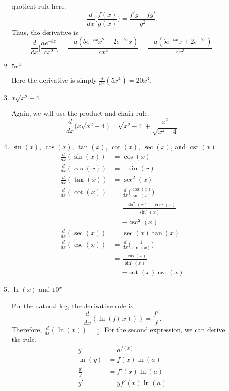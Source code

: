 \begin{enumerate}
\begin{enumerate}[label = (\alph*)]
    quotient rule here,
    \[
    \frac{d}{dx}\bigg(\frac{f(x)}{g(x)}\bigg) = \frac{f'g - fg'}{g^2}.
    \]
    Thus, the derivative is
    \[
    \frac{d}{dx}\bigg[\frac{ae^{-bx}}{cx^2}\bigg] =
    \frac{-a(be^{-bx}x^2 + 2e^{-bx}x)}{cx^4} =
    \frac{-a(be^{-bx}x + 2e^{-bx})}{cx^3}.
    \]
  \item
    \(5x^4\)
    \par\smallskip
    Here the derivative is simply \(\frac{d}{dx}(5x^4) = 20x^3\).
  \item
    \(x\sqrt{x^2 - 4}\)
    \par\smallskip
    Again, we will use the product and chain rule.
    \[
    \frac{d}{dx}\big(x\sqrt{x^2 - 4}\big) = \sqrt{x^2 - 4} +
    \frac{x^2}{\sqrt{x^2 - 4}}
    \]
  \item
    \(\sin(x)\), \(\cos(x)\), \(\tan(x)\), \(\cot(x)\), \(\sec(x)\), and
    \(\csc(x)\)
    \begin{align*}
      \frac{d}{dx}(\sin(x)) &= \cos(x)\\
      \frac{d}{dx}(\cos(x)) &= -\sin(x)\\
      \frac{d}{dx}(\tan(x)) &= \sec^2(x)\\
      \frac{d}{dx}(\cot(x))
      &= \frac{d}{dx}\bigg(\frac{\cos(x)}{\sin(x)}\bigg)\\
                            &= \frac{-\sin^2(x) - \cos^2(x)}{\sin^2(x)}\\
                            &= -\csc^2(x)\\
      \frac{d}{dx}(\sec(x)) &= \sec(x)\tan(x)\\
      \frac{d}{dx}(\csc(x)) &= \frac{d}{dx}\bigg(\frac{1}{\sin(x)}\bigg)\\
                            &= \frac{-\cos(x)}{\sin^2(x)}\\
                            &= -\cot(x)\csc(x)
    \end{align*}
  \item
    \(\ln(x)\) and \(10^x\)
    \par\smallskip
    For the natural log, the derivative rule is
    \[
    \frac{d}{dx}(\ln(f(x))) = \frac{f'}{f}.
    \]
    Therefore, \(\frac{d}{dx}(\ln(x)) = \frac{1}{x}\).
    For the second expression, we can derive the rule.
    \begin{align*}
      y &= a^{f(x)}\\
      \ln(y) &= f(x)\ln(a)\\
      \frac{y'}{y} &= f'(x)\ln(a)\\
      y' &= yf'(x)\ln(a)\\

\end{align*}
\end{enumerate}
\end{enumerate}
